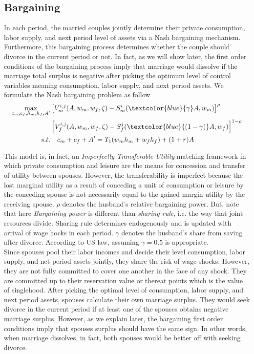 \subsection{Bargaining}
In each period, the married couples jointly determine their private consumption, labor supply, and next period level of assets via a Nash bargaining mechanism. Furthermore, this bargaining process determines whether the couple should divorce in the current period or not. In fact, as we will show later, the first order conditions of the bargaining process imply that marriage would dissolve if the marriage total surplus is negative after picking the optimum level of control variables meaning consumption, labor supply, and next period assets.  We formulate the Nash bargaining problem as follow 
\begin{align*}
\max_{c_m, c_f, h_m, h_f, A'} &\left [ V_m^{i,j} (A, w_m, w_f, \zeta) - S_m^i(\textcolor{blue}{\gamma} A, w_m)\right ]^{\rho} \\
& \left [ V_f^{i,j} (A, w_m, w_f, \zeta) - S_f^j(\textcolor{blue}{(1 -\gamma)} A, w_f)\right ]^{1-\rho} \\
s.t.  &\quad c_m + c_f + A' = T_1(w_m h _m + w_f h_f) + (1+r)A
\end{align*}
  
This model is, in fact, an \emph{Imperfectly Transferable Utility} matching framework in which private consumption and leisure are the means for concession and transfer of utility between spouses. However, the transferability is imperfect because the lost marginal utility as a result of conceding a unit of consumption or leisure by the conceding spouse is not necessarily equal to the gained margin utility by the receiving spouse. $\rho$ denotes the husband's relative bargaining power. But, note that here \emph{Bargaining power} is different than \emph{sharing rule}, i.e. the way that joint resources divide. Sharing rule determines endogenously and is updated with arrival of wage hocks in each period. $\gamma$ denotes the husband's share from saving after divorce. According to US law, assuming $\gamma = 0.5$ is appropriate. \\

Since spouses pool their labor incomes and decide their level consumption, labor supply, and net period assets jointly, they share the risk of wage shocks. However, they are not fully committed to cover one another in the face of any shock. They are committed up to their reservation value or thereat points which is the value of singlehood. After picking the optimal level of consumption, labor supply, and next period assets, spouses calculate their own marriage surplus. They would seek divorce in the current period if at least one of the spouses obtains negative marriage surplus. However, as we explain later, the bargaining first order conditions imply that spouses surplus should have the same sign. In other words, when marriage dissolves, in fact, both spouses would be better off with seeking divorce. \\

